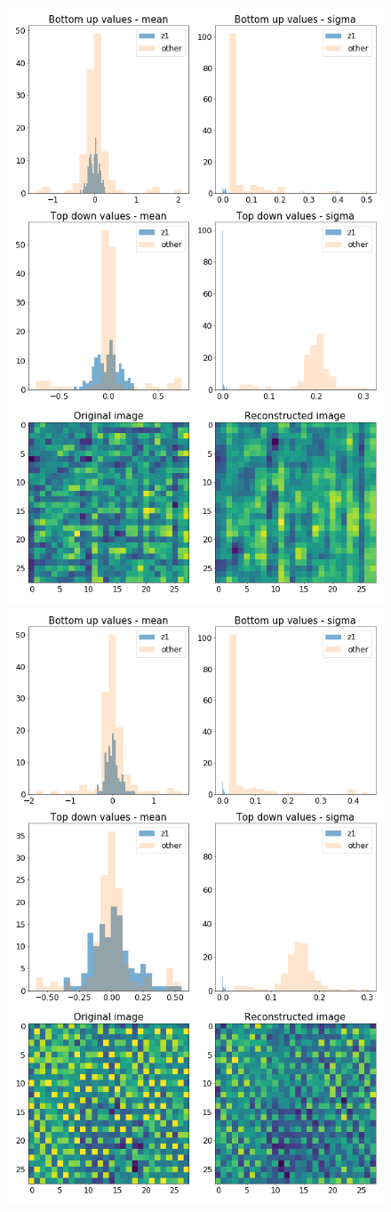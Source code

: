 \documentclass[12pt, english]{article}
\begin{document}
\begin{figure}[H]
  \begin{minipage}{0.5\linewidth}
    \centering
    \includegraphics[width=.6\linewidth]{z1_vis/14_DenseLinLinLadderVAE_noContrastNorm_-stats-1_TD_BU_COMPS_1.png}
  \end{minipage}
  \begin{minipage}{0.5\linewidth}
    \centering
    \includegraphics[width=.6\linewidth]{z1_vis/14_DenseLinLinLadderVAE_noContrastNorm_-stats-2_TD_BU_COMPS_1.png} 
  \end{minipage}


\end{figure}
\end{document}
